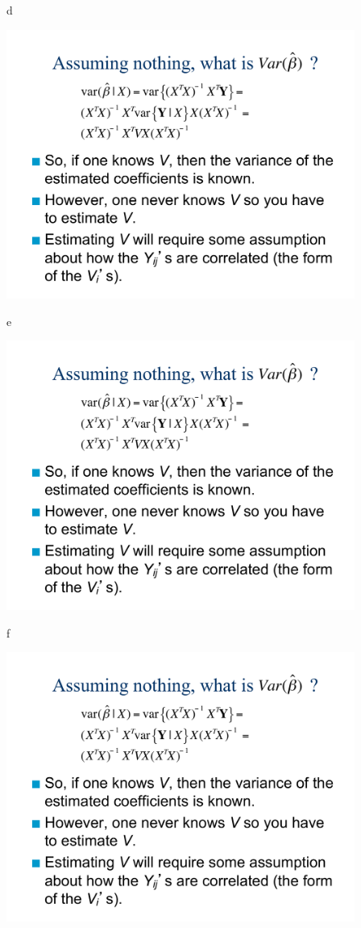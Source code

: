 \documentclass[ignorenonframetext,]{beamer}
\begin{document}
\begin{frame}{d}

\includegraphics[page=5,width=4.5in]{Chapter5AddSlides1.pdf}

\end{frame}

\begin{frame}{e}

\includegraphics[page=6,width=4.5in]{Chapter5AddSlides1.pdf}

\end{frame}

\begin{frame}{f}

\includegraphics[page=7,width=4.5in]{Chapter5AddSlides1.pdf}

\end{frame}
\end{document}
